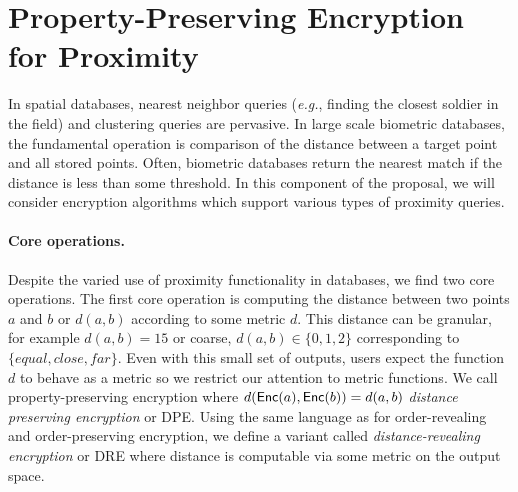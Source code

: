 
\section{Property-Preserving Encryption for Proximity}
\label{sec:ppe}

In spatial databases, nearest neighbor queries (\emph{e.g.}, finding the closest soldier in the field) and clustering queries are pervasive.  %
In large scale biometric databases, the fundamental operation is
comparison of the distance between a target point and all stored points.
Often, biometric databases return the nearest match if the distance is
less than some threshold.
In this component of the proposal, we will consider encryption
algorithms which support various types of proximity queries.

\paragraph{Core operations.}
Despite the varied use of proximity functionality in databases, we find two core operations.     The first core operation is computing the distance between two points $a$ and $b$ or $d(a,b)$ according to some metric $d$.  This distance can be granular, for example $d(a, b) =15$ or coarse, $d(a,b)\in\{0,1,2\}$ corresponding to $\{equal, close, far\}$.  Even with this small set of outputs, users expect the function $d$ to behave as a metric so we restrict our attention to metric functions.  We call property-preserving encryption where $d(\mathsf{Enc}(a), \mathsf{Enc}(b)) = d(a,b)$ \emph{distance preserving encryption} or DPE.  Using the same language as for order-revealing and order-preserving encryption, we define a variant called \emph{distance-revealing encryption} or DRE where distance is computable  via some metric on the output space.

